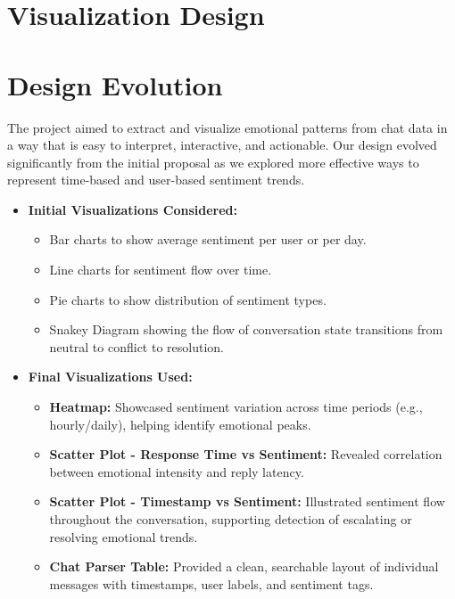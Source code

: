\documentclass{article}\usepackage{graphicx}
\begin{document}
\section{Visualization Design}

\section*{Design Evolution}
The project aimed to extract and visualize emotional patterns from chat data in a way that is easy to interpret, interactive, and actionable. Our design evolved significantly from the initial proposal as we explored more effective ways to represent time-based and user-based sentiment trends.


\begin{itemize}
    \item \textbf{Initial Visualizations Considered:}
    \begin{itemize}
        \item Bar charts to show average sentiment per user or per day.
        \item Line charts for sentiment flow over time.
        \item Pie charts to show distribution of sentiment types.
        \item Snakey Diagram showing the flow of conversation state transitions from neutral to conflict to resolution.
    \end{itemize}

    \item \textbf{Final Visualizations Used:}
    \begin{itemize}
        \item \textbf{Heatmap:} Showcased sentiment variation across time periods (e.g., hourly/daily), helping identify emotional peaks.
        \item \textbf{Scatter Plot - Response Time vs Sentiment:} Revealed correlation between emotional intensity and reply latency.
        \item \textbf{Scatter Plot - Timestamp vs Sentiment:} Illustrated sentiment flow throughout the conversation, supporting detection of escalating or resolving emotional trends.
        \item \textbf{Chat Parser Table:} Provided a clean, searchable layout of individual messages with timestamps, user labels, and sentiment tags.
    \end{itemize}    


\end{itemize}
\end{document}
